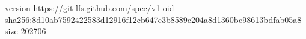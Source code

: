 version https://git-lfs.github.com/spec/v1
oid sha256:8d10ab7592422583d12916f12cb647e3b8589c204a8d1360bc98613bdfab05a8
size 202706
